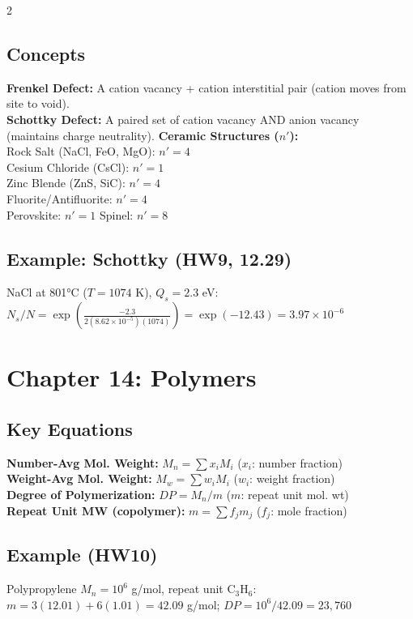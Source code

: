 \documentclass[8pt]{extarticle}
\begin{document}
\begin{multicols*}{2}
\subsection*{Concepts}
\textbf{Frenkel Defect:} A cation vacancy + cation interstitial pair (cation moves from site to void). \\
\textbf{Schottky Defect:} A paired set of cation vacancy AND anion vacancy (maintains charge neutrality).
  \textbf{Ceramic Structures ($n'$):} \\
  Rock Salt (NaCl, FeO, MgO): $n'=4$ \\
  Cesium Chloride (CsCl): $n'=1$ \\
  Zinc Blende (ZnS, SiC): $n'=4$ \\
  Fluorite/Antifluorite: $n'=4$ \\
  Perovskite: $n'=1$ \quad Spinel: $n'=8$

\subsection*{Example: Schottky (HW9, 12.29)}
NaCl at 801°C ($T=1074$ K), $Q_s=2.3$ eV: \\
$N_s/N = \exp\!\left(\frac{-2.3}{2(8.62\times10^{-5})(1074)}\right) = \exp(-12.43) = 3.97\times10^{-6}$

\section*{Chapter 14: Polymers}
\subsection*{Key Equations}
\textbf{Number-Avg Mol. Weight:} $M_n = \sum x_i M_i$ \quad ($x_i$: number fraction) \\
\textbf{Weight-Avg Mol. Weight:} $M_w = \sum w_i M_i$ \quad ($w_i$: weight fraction) \\
\textbf{Degree of Polymerization:} $DP = M_n / m$ \quad ($m$: repeat unit mol. wt) \\
\textbf{Repeat Unit MW (copolymer):} $m = \sum f_j m_j$ \quad ($f_j$: mole fraction)
\subsection*{Example (HW10)}
Polypropylene $M_n = 10^6$ g/mol, repeat unit C$_3$H$_6$: \\
$m = 3(12.01)+6(1.01) = 42.09$ g/mol; $DP = 10^6/42.09 = 23,760$


\end{multicols*}
\end{document}
